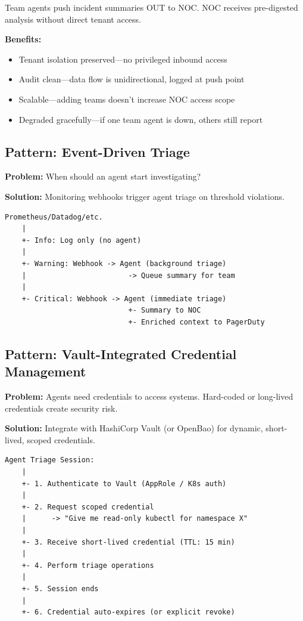 Team agents push incident summaries OUT to NOC. NOC receives pre-digested analysis without direct tenant access.

\textbf{Benefits:}
\begin{itemize}
    \item Tenant isolation preserved---no privileged inbound access
    \item Audit clean---data flow is unidirectional, logged at push point
    \item Scalable---adding teams doesn't increase NOC access scope
    \item Degraded gracefully---if one team agent is down, others still report
\end{itemize}

\subsection{Pattern: Event-Driven Triage}
\label{subsec:event-driven}

\textbf{Problem:} When should an agent start investigating?

\textbf{Solution:} Monitoring webhooks trigger agent triage on threshold violations.

\begin{lstlisting}[caption={Event-Driven Triage Routing}]
Prometheus/Datadog/etc.
    |
    +- Info: Log only (no agent)
    |
    +- Warning: Webhook -> Agent (background triage)
    |                        -> Queue summary for team
    |
    +- Critical: Webhook -> Agent (immediate triage)
                             +- Summary to NOC
                             +- Enriched context to PagerDuty
\end{lstlisting}

\subsection{Pattern: Vault-Integrated Credential Management}
\label{subsec:vault-integration}

\textbf{Problem:} Agents need credentials to access systems. Hard-coded or long-lived credentials create security risk.

\textbf{Solution:} Integrate with HashiCorp Vault (or OpenBao) for dynamic, short-lived, scoped credentials.

\begin{lstlisting}[caption={Vault-Integrated Credential Flow}]
Agent Triage Session:
    |
    +- 1. Authenticate to Vault (AppRole / K8s auth)
    |
    +- 2. Request scoped credential
    |      -> "Give me read-only kubectl for namespace X"
    |
    +- 3. Receive short-lived credential (TTL: 15 min)
    |
    +- 4. Perform triage operations
    |
    +- 5. Session ends
    |
    +- 6. Credential auto-expires (or explicit revoke)
\end{lstlisting}

